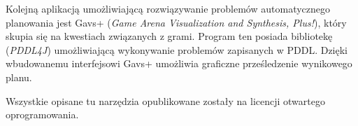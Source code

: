 Kolejną aplikacją umożliwiającą rozwiązywanie problemów automatycznego planowania jest Gavs+ (\textit{Game Arena Visualization and Synthesis, Plus!})\cite{gavs}, który skupia się na kwestiach związanych z grami. Program ten posiada bibliotekę (\textit{PDDL4J}) umożliwiającą wykonywanie problemów zapisanych w PDDL. Dzięki wbudowanemu interfejsowi Gavs+ umożliwia graficzne prześledzenie wynikowego planu.

Wszystkie opisane tu narzędzia opublikowane zostały na licencji otwartego oprogramowania.


